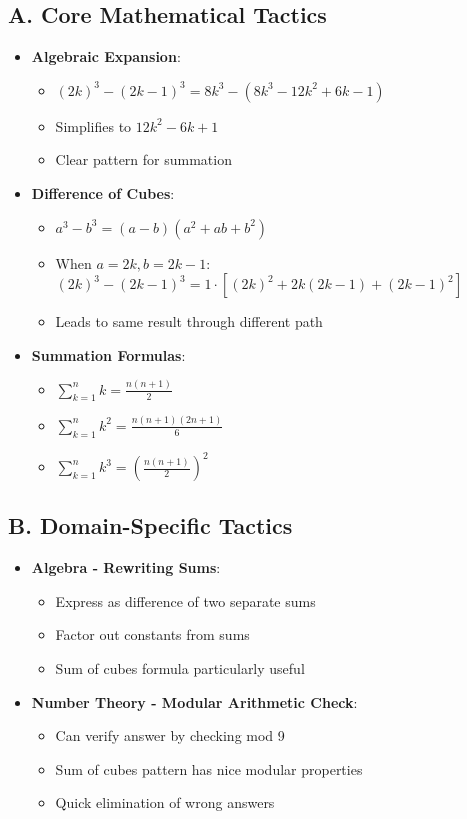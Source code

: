 \documentclass[12pt]{article}
\begin{document}
\begin{tacticalbox}
\subsection*{A. Core Mathematical Tactics}
\begin{itemize}[leftmargin=*]
    \item \textbf{Algebraic Expansion}: 
    \begin{itemize}
        \item $(2k)^3 - (2k-1)^3 = 8k^3 - (8k^3 - 12k^2 + 6k - 1)$
        \item Simplifies to $12k^2 - 6k + 1$
        \item Clear pattern for summation
    \end{itemize}
    \item \textbf{Difference of Cubes}: 
    \begin{itemize}
        \item $a^3 - b^3 = (a-b)(a^2+ab+b^2)$
        \item When $a = 2k, b = 2k-1$: $(2k)^3 - (2k-1)^3 = 1 \cdot [(2k)^2 + 2k(2k-1) + (2k-1)^2]$
        \item Leads to same result through different path
    \end{itemize}
    \item \textbf{Summation Formulas}: 
    \begin{itemize}
        \item $\sum_{k=1}^{n} k = \frac{n(n+1)}{2}$
        \item $\sum_{k=1}^{n} k^2 = \frac{n(n+1)(2n+1)}{6}$
        \item $\sum_{k=1}^{n} k^3 = \left(\frac{n(n+1)}{2}\right)^2$
    \end{itemize}
\end{itemize}

\subsection*{B. Domain-Specific Tactics}
\begin{itemize}[leftmargin=*]
    \item \textbf{Algebra - Rewriting Sums}:
    \begin{itemize}
        \item Express as difference of two separate sums
        \item Factor out constants from sums
        \item Sum of cubes formula particularly useful
    \end{itemize}
    \item \textbf{Number Theory - Modular Arithmetic Check}:
    \begin{itemize}
        \item Can verify answer by checking mod 9
        \item Sum of cubes pattern has nice modular properties
        \item Quick elimination of wrong answers
    \end{itemize}
\end{itemize}


\end{tacticalbox}
\end{document}
